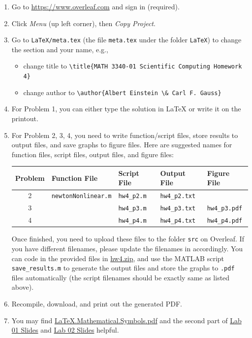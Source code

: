 \begin{enumerate}[label={\arabic*.}]
  \item Go to \url{https://www.overleaf.com} and sign in (required).
  \item Click \emph{Menu} (up left corner), then \emph{Copy Project}.
  \item Go to \verb|LaTeX/meta.tex| (the file \verb|meta.tex| under the folder \verb|LaTeX|) to change the section and your name, e.g.,
    \begin{itemize}
      \item change title to \verb|\title{MATH 3340-01 Scientific Computing Homework 4}|
      \item change author to \verb|\author{Albert Einstein \& Carl F. Gauss}|
    \end{itemize}
  \item For Problem 1, you can either type the solution in \LaTeX{} or write it on the printout.
  \item For Problem 2, 3, 4, you need to write function/script files, store results to output files, and save graphs to figure files. Here are suggested names for function files, script files, output files, and figure files:
    \begin{table}[!hbtp]
      \centering
      \begin{tabular}{cllll}
        \toprule
        Problem & Function File            & Script File     & Output File       & Figure File \\
        \midrule
        2       & \verb|newtonNonlinear.m| & \verb|hw4_p2.m| & \verb|hw4_p2.txt| &                   \\
        3       &                          & \verb|hw4_p3.m| & \verb|hw4_p3.txt| & \verb|hw4_p3.pdf| \\
        4       &                          & \verb|hw4_p4.m| & \verb|hw4_p4.txt| & \verb|hw4_p4.pdf| \\
        \bottomrule
      \end{tabular}
    \end{table}

    Once finished, you need to upload these files to the folder \verb|src| on Overleaf. If you have different filenames, please update the filenames in \verb|| accordingly. You can code in the provided files in \href{https://libaoj.in/courses/2021s/MATH3340/Homework/4/hw4.zip}{hw4.zip}, and use the MATLAB script \verb|save_results.m| to generate the output files and store the graphs to \verb|.pdf| files automatically (the script filenames should be exactly same as listed above).
  \item Recompile, download, and print out the generated PDF.
  \item You may find \href{https://libaoj.in/files/LaTeX.Mathematical.Symbols.pdf}{\LaTeX{}.Mathematical.Symbols.pdf} and the second part of \href{https://libaoj.in/courses/2021s/MATH3341/slides/Math.3341.Lab.01.Slides.pdf}{Lab 01 Slides} and \href{https://libaoj.in/courses/2021s/MATH3341/slides/Math.3341.Lab.02.Slides.pdf}{Lab 02 Slides} helpful.
\end{enumerate}

